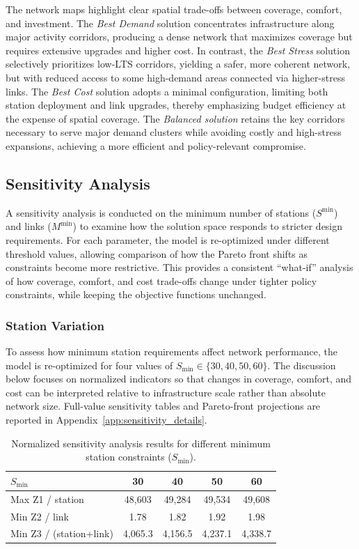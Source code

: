 \documentclass[preprint,authoryear,10pt]{elsarticle}
\begin{document}
The network maps highlight clear spatial trade-offs between coverage, comfort, and investment. The \textit{Best Demand} solution concentrates infrastructure along major activity corridors, producing a dense network that maximizes coverage but requires extensive upgrades and higher cost. In contrast, the \textit{Best Stress} solution selectively prioritizes low-LTS corridors, yielding a safer, more coherent network, but with reduced access to some high-demand areas connected via higher-stress links. The \textit{Best Cost} solution adopts a minimal configuration, limiting both station deployment and link upgrades, thereby emphasizing budget efficiency at the expense of spatial coverage. The \textit{Balanced solution} retains the key corridors necessary to serve major demand clusters while avoiding costly and high-stress expansions, achieving a more efficient and policy-relevant compromise.

\subsection{Sensitivity Analysis}

A sensitivity analysis is conducted on the minimum number of stations ($S^{\min}$) and links ($M^{\min}$) to examine how the solution space responds to stricter design requirements. For each parameter, the model is re-optimized under different threshold values, allowing comparison of how the Pareto front shifts as constraints become more restrictive. This provides a consistent ``what-if'' analysis of how coverage, comfort, and cost trade-offs change under tighter policy constraints, while keeping the objective functions unchanged.

\subsubsection{Station Variation}

To assess how minimum station requirements affect network performance, the model is re-optimized for four values of $S_{\min}\in\{30,40,50,60\}$. The discussion below focuses on normalized indicators so that changes in coverage, comfort, and cost can be interpreted relative to infrastructure scale rather than absolute network size. Full-value sensitivity tables and Pareto-front projections are reported in Appendix~\ref{app:sensitivity_details}.

\begin{table}[!ht]
  \caption{Normalized sensitivity analysis results for different minimum station constraints ($S_{\min}$).}
  \label{tab:sensitivity_smin_normalized}
  \centering
  \small
  \begin{tabular}{@{}lcccc@{}}
    \hline
    \textbf{$S_{\min}$} & \textbf{30} & \textbf{40} & \textbf{50} & \textbf{60} \\
    \hline
    Max Z1 / station & 48,603 & 49,284 & 49,534 & 49,608 \\
    Min Z2 / link    & 1.78   & 1.82   & 1.92   & 1.98   \\
    Min Z3 / (station+link) & 4,065.3 & 4,156.5 & 4,237.1 & 4,338.7 \\
    \hline
  \end{tabular}
\end{table}
\end{document}
